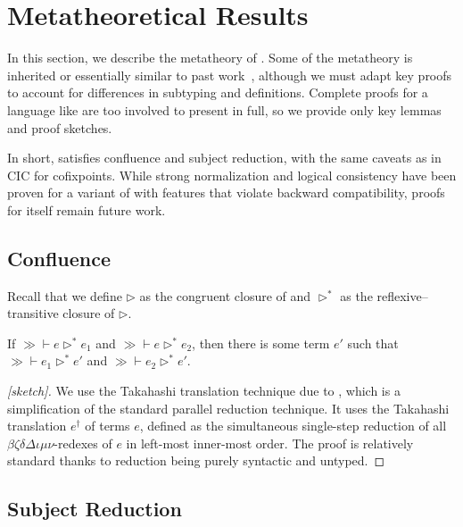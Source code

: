 \section{Metatheoretical Results}
\label{sec:metatheory}

In this section, we describe the metatheory of \lang.
Some of the metatheory is inherited or essentially similar to past work~\citep{cic-hat-minus,cc-hat-omega,cic-hat},
although we must adapt key proofs to account for differences in subtyping and definitions.
Complete proofs for a language like \lang are too involved to present in full,
so we provide only key lemmas and proof sketches.

In short, \lang satisfies confluence and subject reduction, with the same caveats as in CIC for cofixpoints.
While strong normalization and logical consistency have been proven for a variant of \lang
with features that violate backward compatibility,
proofs for \lang itself remain future work.

\subsection{Confluence}

Recall that we define $\rhd$ as the congruent closure of \reduction and $\rhd^*$ as the reflexive--transitive closure of $\rhd$.

\begin{theorem}[Confluence]
\label{thm:metatheory:confluence}
  If $\gg \vdash e \rhd^* e_1$ and $\gg \vdash e \rhd^* e_2$,
  then there is some term $e'$ such that $\gg \vdash e_1 \rhd^* e'$ and $\gg \vdash e_2 \rhd^* e'$.
\end{theorem}

\begin{proof}[{[sketch]}]
  We use the Takahashi translation technique due to \citet{takahashitrans},
  which is a simplification of the standard parallel reduction technique.
  It uses the Takahashi translation $e^\dagger$ of terms $e$,
  defined as the simultaneous single-step reduction of all
  $\beta\zeta\delta\Delta\iota\mu\nu$-redexes of $e$ in left-most inner-most order.
  The proof is relatively standard thanks to reduction being purely syntactic and untyped.
\end{proof}

\subsection{Subject Reduction}
\label{sec:metatheory:sub-red}


